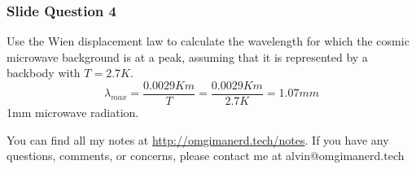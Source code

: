 \documentclass{math}
\begin{document}
\subsubsection*{Slide Question 4}
Use the Wien displacement law to calculate the wavelength for which the
cosmic microwave background is at a peak, assuming that it is represented
by a backbody with \( T = 2.7K \).
\[ \lambda_{max} = \frac{0.0029Km}{T} = \frac{0.0029Km}{2.7K} = 1.07mm \]
1mm microwave radiation.

\begin{center}
  You can find all my notes at \url{http://omgimanerd.tech/notes}. If you have
  any questions, comments, or concerns, please contact me at
  alvin@omgimanerd.tech
\end{center}
\end{document}
